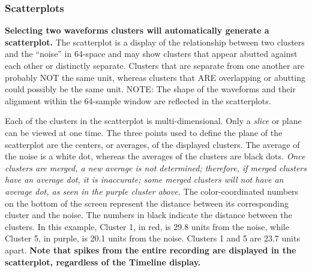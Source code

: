 \documentclass[12pt]{article}
\begin{document}
\subsubsection{Scatterplots}
\textbf{Selecting two waveforms clusters will automatically generate a
  scatterplot.} The scatterplot is a display of the relationship
between two clusters and the ``noise'' in 64-space and may show
clusters that appear abutted against each other or distinctly
separate. Clusters that are separate from one another are probably NOT
the same unit, whereas clusters that ARE overlapping or abutting could
possibly be the same unit. NOTE: The shape of the waveforms and their
alignment within the 64-sample window are reflected in the
scatterplots.
\begin{center}
  \label{scatter}
\end{center}

Each of the clusters in the scatterplot is multi-dimensional. Only a
\textit{slice} or plane can be viewed at one time.  The three points
used to define the plane of the scatterplot are the centers, or
averages, of the displayed clusters. The average of the noise is a
white dot, whereas the averages of the clusters are black
dots. \textit{Once clusters are merged, a new average is not
  determined; therefore, if merged clusters have an average dot, it is
  inaccurate; some merged clusters will not have an average dot, as
  seen in the purple cluster above.}  The color-coordinated numbers on
the bottom of the screen represent the distance between its
corresponding cluster and the noise. The numbers in black indicate the
distance between the clusters. In this example, Cluster 1, in red, is
29.8 units from the noise, while Cluster 5, in purple, is 20.1 units
from the noise. Clusters 1 and 5 are 23.7 units apart. \textbf{Note
  that spikes from the entire recording are displayed in the
  scatterplot, regardless of the Timeline display.}
\end{document}
